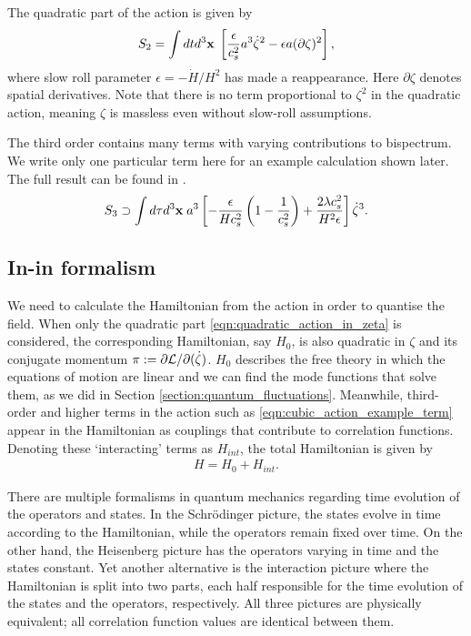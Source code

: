The quadratic part of the action is given by
\begin{align}
	S_2 = \int dt d^3\mathbf{x} \; \left[ \frac{\epsilon}{c_s^2} a^3 \dot{\zeta}^2 - \epsilon a(\partial\zeta)^2  \right], \label{eqn:quadratic_action_in_zeta}
\end{align}
where slow roll parameter $\epsilon=-\dot{H}/H^2$ has made a reappearance. Here $\partial\zeta$ denotes spatial derivatives. Note that there is no term proportional to $\zeta^2$ in the quadratic action, meaning $\zeta$ is massless even without slow-roll assumptions.

The third order contains many terms with varying contributions to bispectrum. We write only one particular term here for an example calculation shown later. The full result can be found in \cite{Chen2007b}. 
\begin{align}
	S_3 \supset \int d\tau d^3\mathbf{x} \; a^3 \left[ -\frac{\epsilon}{H c_s^2} \left( 1 - \frac{1}{c_s^2} \right) + \frac{2\lambda c_s^2}{H^2 \epsilon} \right] \dot{\zeta}^3.	 \label{eqn:cubic_action_example_term}
\end{align}

\subsection{In-in formalism} \label{section:in_in_formalism}

We need to calculate the Hamiltonian from the action in order to quantise the field. When only the quadratic part \eqref{eqn:quadratic_action_in_zeta} is considered, the corresponding Hamiltonian, say $H_0$, is also quadratic in $\zeta$ and its conjugate momentum $\pi := \partial\mathcal{L}/\partial(\dot{\zeta})$. $H_0$ describes the free theory in which the equations of motion are linear and we can find the mode functions that solve them, as we did in Section \ref{section:quantum_fluctuations}. Meanwhile, third-order and higher terms in the action such as \eqref{eqn:cubic_action_example_term} appear in the Hamiltonian as couplings that contribute to correlation functions. Denoting these `interacting' terms as $H_{int}$, the total Hamiltonian is given by
\begin{align}
	H = H_0 + H_{int}.
\end{align}

There are multiple formalisms in quantum mechanics regarding time evolution of the operators and states. In the Schr\"odinger picture, the states evolve in time according to the Hamiltonian, while the operators remain fixed over time. On the other hand, the Heisenberg picture has the operators varying in time and the states constant. Yet another alternative is the interaction picture where the Hamiltonian is split into two parts, each half responsible for the time evolution of the states and the operators, respectively. All three pictures are physically equivalent; all correlation function values are identical between them.

